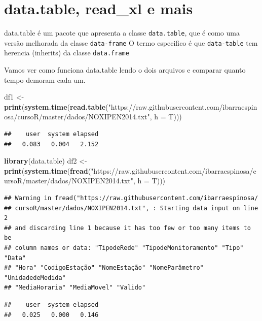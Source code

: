 \documentclass[]{book}
\newenvironment{Shaded}{\begin{snugshade}}{\end{snugshade}}
\newcommand{\KeywordTok}[1]{\textcolor[rgb]{0.13,0.29,0.53}{\textbf{#1}}}
\newcommand{\DataTypeTok}[1]{\textcolor[rgb]{0.13,0.29,0.53}{#1}}
\newcommand{\StringTok}[1]{\textcolor[rgb]{0.31,0.60,0.02}{#1}}
\newcommand{\NormalTok}[1]{#1}
\begin{document}
\section{data.table, read\_xl e mais}\label{data.table-read_xl-e-mais}

data.table é um pacote que apresenta a classe \texttt{data.table}, que é
como uma versão melhorada da classe \texttt{data-frame} O termo
especifico é que \texttt{data-table} tem herencia (inherits) da classe
\texttt{data.frame}

Vamos ver como funciona data.table lendo o dois arquivos e comparar
quanto tempo demoram cada um.

\begin{Shaded}
\begin{Highlighting}[]
\NormalTok{df1 <-}\StringTok{ }\KeywordTok{print}\NormalTok{(}\KeywordTok{system.time}\NormalTok{(}\KeywordTok{read.table}\NormalTok{(}\StringTok{"https://raw.githubusercontent.com/ibarraespinosa/cursoR/master/dados/NOXIPEN2014.txt"}\NormalTok{, }\DataTypeTok{h =}\NormalTok{ T)))}
\end{Highlighting}
\end{Shaded}

\begin{verbatim}
##    user  system elapsed 
##   0.083   0.004   2.152
\end{verbatim}

\begin{Shaded}
\begin{Highlighting}[]
\KeywordTok{library}\NormalTok{(data.table)}
\NormalTok{df2 <-}\StringTok{ }\KeywordTok{print}\NormalTok{(}\KeywordTok{system.time}\NormalTok{(}\KeywordTok{fread}\NormalTok{(}\StringTok{"https://raw.githubusercontent.com/ibarraespinosa/cursoR/master/dados/NOXIPEN2014.txt"}\NormalTok{, }\DataTypeTok{h =}\NormalTok{ T)))}
\end{Highlighting}
\end{Shaded}

\begin{verbatim}
## Warning in fread("https://raw.githubusercontent.com/ibarraespinosa/
## cursoR/master/dados/NOXIPEN2014.txt", : Starting data input on line 2
## and discarding line 1 because it has too few or too many items to be
## column names or data: "TipodeRede" "TipodeMonitoramento" "Tipo" "Data"
## "Hora" "CodigoEstação" "NomeEstação" "NomeParâmetro" "UnidadedeMedida"
## "MediaHoraria" "MediaMovel" "Valido"
\end{verbatim}

\begin{verbatim}
##    user  system elapsed 
##   0.025   0.000   0.146
\end{verbatim}
\end{document}
